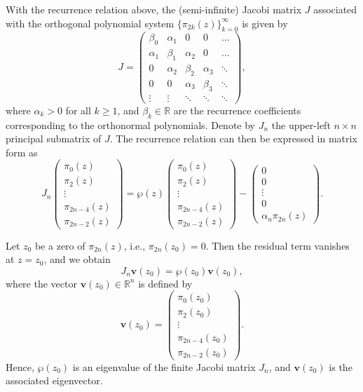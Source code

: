 \documentclass[11pt,a4paper]{article}
\theoremstyle{definition}
\numberwithin{equation}{section}
\numberwithin{theorem}{section}
\begin{document}
With the recurrence relation above, the (semi-infinite) Jacobi matrix \( J \) associated with the orthogonal polynomial system \( \{\pi_{2k}(z)\}_{k=0}^\infty \) is given by
\begin{equation}
    J = \begin{pmatrix}
        \beta_0 & \alpha_1 & 0 & 0 & \dots \\
        \alpha_1 & \beta_1 & \alpha_2 & 0 & \dots \\
        0 & \alpha_2 & \beta_2 & \alpha_3 & \ddots \\
        0 & 0 & \alpha_3 & \beta_3 & \ddots \\
        \vdots & \vdots & \ddots & \ddots & \ddots
    \end{pmatrix},
\end{equation}
where \( \alpha_k > 0 \) for all \( k \geq 1 \), and \( \beta_k \in \mathbb{R} \) are the recurrence coefficients corresponding to the orthonormal polynomials. Denote by \( J_n \) the upper-left \( n \times n \) principal submatrix of \( J \). The recurrence relation can then be expressed in matrix form as
\begin{equation}
    J_n \begin{pmatrix}
        \pi_0(z) \\
        \pi_2(z) \\
        \vdots \\
        \pi_{2n-4}(z) \\
        \pi_{2n-2}(z)
    \end{pmatrix}
    =
    \wp(z) \begin{pmatrix}
        \pi_0(z) \\
        \pi_2(z) \\
        \vdots \\
        \pi_{2n-4}(z) \\
        \pi_{2n-2}(z)
    \end{pmatrix}
    -
    \begin{pmatrix}
        0 \\
        0 \\
        \vdots \\
        0 \\
        \alpha_n \pi_{2n}(z)
    \end{pmatrix}.
\end{equation}

Let \( z_0 \) be a zero of \( \pi_{2n}(z) \), i.e., \( \pi_{2n}(z_0) = 0 \). Then the residual term vanishes at \( z = z_0 \), and we obtain
\begin{equation}
    J_n \mathbf{v}(z_0) = \wp(z_0) \mathbf{v}(z_0),
\end{equation}
where the vector \( \mathbf{v}(z_0) \in \mathbb{R}^n \) is defined by
\[
\mathbf{v}(z_0) = \begin{pmatrix}
    \pi_0(z_0) \\
    \pi_2(z_0) \\
    \vdots \\
    \pi_{2n-4}(z_0) \\
    \pi_{2n-2}(z_0)
\end{pmatrix}.
\]
Hence, \( \wp(z_0) \) is an eigenvalue of the finite Jacobi matrix \( J_n \), and \( \mathbf{v}(z_0) \) is the associated eigenvector.
\end{document}
